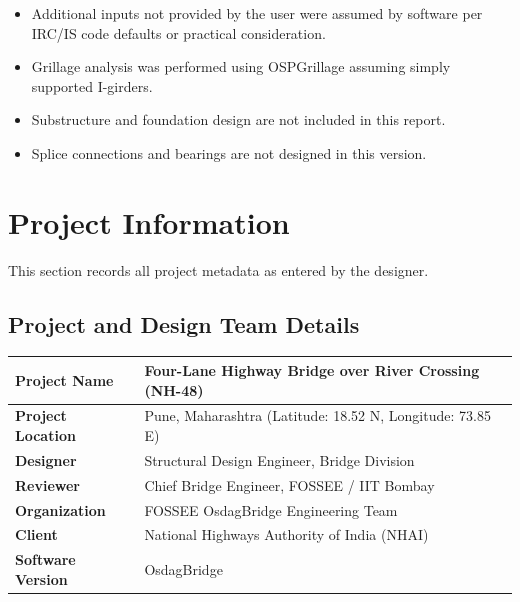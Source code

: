 \documentclass[12pt,a4paper]{report}
\numberwithin{table}{chapter}
\numberwithin{figure}{chapter}
\begin{document}
\begin{itemize}
\item Additional inputs not provided by the user were assumed by software per IRC/IS code defaults or practical consideration.
\item Grillage analysis was performed using OSPGrillage assuming simply supported I-girders.
\item Substructure and foundation design are not included in this report.
\item Splice connections and bearings are not designed in this version.
\end{itemize}

\titleformat{\chapter}[block]{\normalfont\Large\bfseries\centering}{\thechapter}{1em}{}
\titlespacing*{\chapter}{0pt}{-30pt}{10pt}


\chapter{Project Information}

This section records all project metadata as entered by the designer.

\section{Project and Design Team Details}
\label{sec:project-details}

\begin{tabular}{|L{5.5cm}|L{8.5cm}|}
\hline
\textbf{Project Name} & Four-Lane Highway Bridge over River Crossing (NH-48) \\
\hline
\textbf{Project Location} & Pune, Maharashtra (Latitude:\allowbreak{} 18.52 N, Longitude:\allowbreak{} 73.85 E) \\
\hline
\textbf{Designer} & Structural Design Engineer, Bridge Division \\
\hline
\textbf{Reviewer} & Chief Bridge Engineer, FOSSEE / IIT Bombay \\
\hline
\textbf{Organization} & FOSSEE OsdagBridge Engineering Team \\
\hline
\textbf{Client} & National Highways Authority of India (NHAI) \\
\hline
\textbf{Software Version} & OsdagBridge \\
\hline
\end{tabular}
\end{document}
